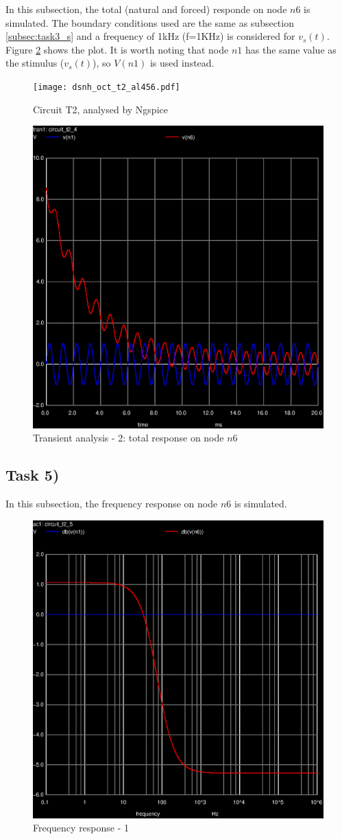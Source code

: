 In this subsection, the total (natural and forced) responde on node $n6$ is simulated. The boundary
conditions used are the same as subsection \ref{subsec:task3_s} and a frequency of 1kHz (f=1KHz) is
considered for $v_s(t)$. Figure \ref{fig:trans-2} shows the plot. It is worth noting that node $n1$ has
the same value as the stimulus ($v_s(t)$), so $V(n1)$ is used instead.

\begin{figure}[ht]
	\centering
	\texttt{[image: dsnh\_oct\_t2\_al456.pdf]}
	\caption{Circuit T2, analysed by Ngspice}
\label{fig:Dsnh_sim_t2}
\end{figure}

\begin{figure}[ht]
	\centering
	\includegraphics[width=0.55\linewidth]{trans-2.eps}
	\caption{Transient analysis - 2: total response on node $n6$}
\label{fig:trans-2}
\end{figure}


\subsection{Task 5)}
\label{subsec:task5_s}

In this subsection, the frequency response on node $n6$ is simulated.

\begin{figure}[ht]
	\centering
	\includegraphics[width=0.55\linewidth]{ac-1.eps}
	\caption{Frequency response - 1}
\label{fig:Dsnh_sim_t2}
\end{figure}

